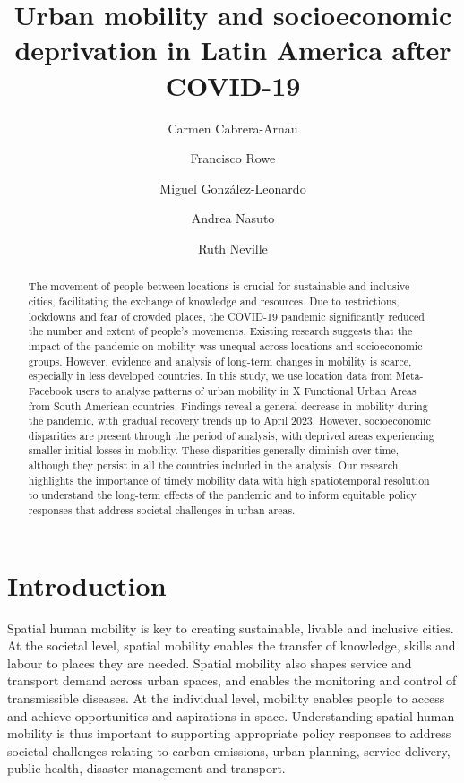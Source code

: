 \documentclass[
  11pt,
]{article}
\title{\textbf{Urban mobility and socioeconomic deprivation in Latin
America after COVID-19}}
\author[1]{Carmen Cabrera-Arnau}
\author[1]{Francisco Rowe}
\author[2]{Miguel González-Leonardo}
\author[1]{Andrea Nasuto}
\author[1]{Ruth Neville}
\affil[1]{Geographic Data Science Lab, Department of Geography and
Planning, University of Liverpool, Liverpool, UK}
\affil[2]{Centre for Demographic Urban and Environmental Studies, El
Colegio de México, Ciudad de México, México}
\date{}
\begin{document}
\maketitle
\begin{abstract}
The movement of people between locations is crucial for sustainable and
inclusive cities, facilitating the exchange of knowledge and resources.
Due to restrictions, lockdowns and fear of crowded places, the COVID-19
pandemic significantly reduced the number and extent of people's
movements. Existing research suggests that the impact of the pandemic on
mobility was unequal across locations and socioeconomic groups. However,
evidence and analysis of long-term changes in mobility is scarce,
especially in less developed countries. In this study, we use location
data from Meta-Facebook users to analyse patterns of urban mobility in X
Functional Urban Areas from South American countries. Findings reveal a
general decrease in mobility during the pandemic, with gradual recovery
trends up to April 2023. However, socioeconomic disparities are present
through the period of analysis, with deprived areas experiencing smaller
initial losses in mobility. These disparities generally diminish over
time, although they persist in all the countries included in the
analysis. Our research highlights the importance of timely mobility data
with high spatiotemporal resolution to understand the long-term effects
of the pandemic and to inform equitable policy responses that address
societal challenges in urban areas.
\end{abstract}
\ifdefined\Shaded\renewenvironment{Shaded}{\begin{tcolorbox}[boxrule=0pt, frame hidden, breakable, enhanced, interior hidden, sharp corners, borderline west={3pt}{0pt}{shadecolor}]}{\end{tcolorbox}}\fi

\hypertarget{sec-intro}{%
\section{Introduction}\label{sec-intro}}

Spatial human mobility is key to creating sustainable, livable and
inclusive cities. At the societal level, spatial mobility enables the
transfer of knowledge, skills and labour to places they are needed.
Spatial mobility also shapes service and transport demand across urban
spaces, and enables the monitoring and control of transmissible
diseases. At the individual level, mobility enables people to access and
achieve opportunities and aspirations in space. Understanding spatial
human mobility is thus important to supporting appropriate policy
responses to address societal challenges relating to carbon emissions,
urban planning, service delivery, public health, disaster management and
transport.
\end{document}
